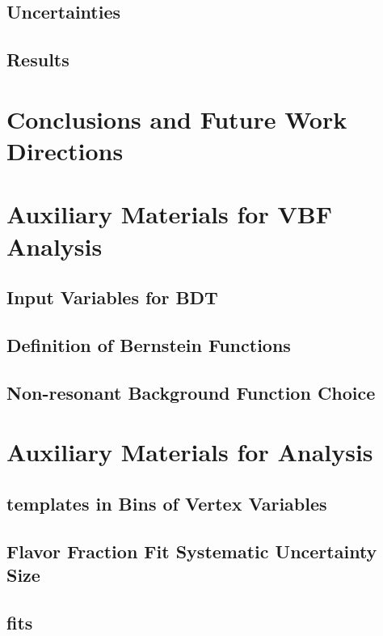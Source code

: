 \documentclass{report}
\begin{document}
\section{Uncertainties}
\label{sec:gbb-systs}



\section{Results}
\label{sec:gbb-results}

\clearpage

\chapter{Conclusions and Future Work Directions}
\label{chap:conclusion}

\clearpage

\appendix
\chapter{Auxiliary Materials for VBF \Hbb Analysis}
\section{Input Variables for BDT}

\section{Definition of Bernstein Functions}

\section{Non-resonant Background Function Choice}


\chapter{Auxiliary Materials for \gbb Analysis}
\section{\subsdzero templates in Bins of Vertex Variables}

\clearpage
\section{Flavor Fraction Fit Systematic Uncertainty Size}

\clearpage
\section{\subsdzero fits}

\clearpage
\end{document}
